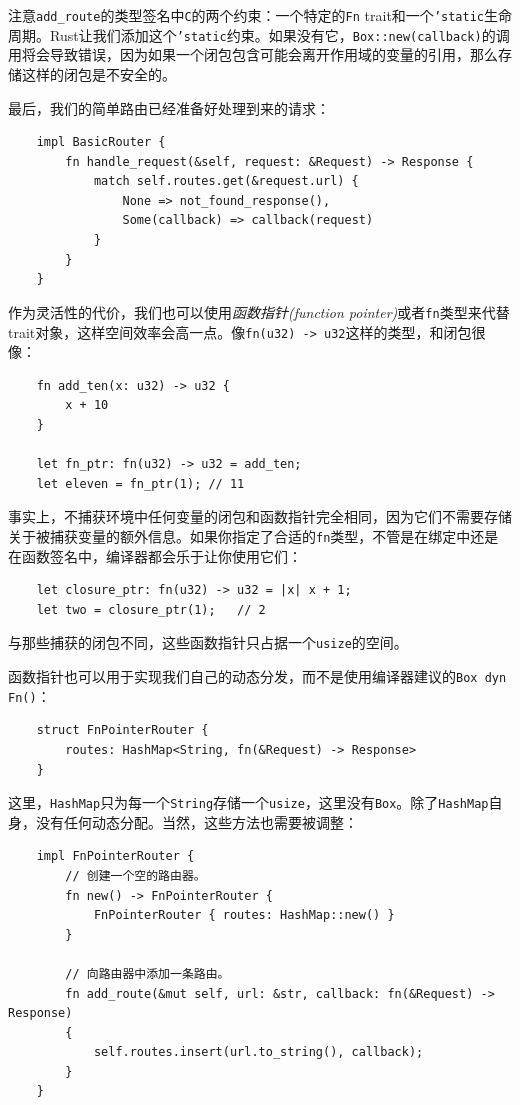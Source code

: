 \begin{note}
    注意\texttt{add\_route}的类型签名中\texttt{C}的两个约束：一个特定的\texttt{Fn} trait和一个\texttt{'static}生命周期。Rust让我们添加这个\texttt{'static}约束。如果没有它，\texttt{Box::new(callback)}的调用将会导致错误，因为如果一个闭包包含可能会离开作用域的变量的引用，那么存储这样的闭包是不安全的。
\end{note}

最后，我们的简单路由已经准备好处理到来的请求：
\begin{verbatim}
    impl BasicRouter {
        fn handle_request(&self, request: &Request) -> Response {
            match self.routes.get(&request.url) {
                None => not_found_response(),
                Some(callback) => callback(request)
            }
        }
    }
\end{verbatim}

作为灵活性的代价，我们也可以使用\emph{函数指针(function pointer)}或者\texttt{fn}类型来代替trait对象，这样空间效率会高一点。像\texttt{fn(u32) -> u32}这样的类型，和闭包很像：
\begin{verbatim}
    fn add_ten(x: u32) -> u32 {
        x + 10
    }

    let fn_ptr: fn(u32) -> u32 = add_ten;
    let eleven = fn_ptr(1); // 11
\end{verbatim}

事实上，不捕获环境中任何变量的闭包和函数指针完全相同，因为它们不需要存储关于被捕获变量的额外信息。如果你指定了合适的\texttt{fn}类型，不管是在绑定中还是在函数签名中，编译器都会乐于让你使用它们：
\begin{verbatim}
    let closure_ptr: fn(u32) -> u32 = |x| x + 1;
    let two = closure_ptr(1);   // 2
\end{verbatim}

与那些捕获的闭包不同，这些函数指针只占据一个\texttt{usize}的空间。

函数指针也可以用于实现我们自己的动态分发，而不是使用编译器建议的\texttt{Box dyn Fn()}：
\begin{verbatim}
    struct FnPointerRouter {
        routes: HashMap<String, fn(&Request) -> Response>
    }
\end{verbatim}

这里，\texttt{HashMap}只为每一个\texttt{String}存储一个\texttt{usize}，这里没有\texttt{Box}。除了\texttt{HashMap}自身，没有任何动态分配。当然，这些方法也需要被调整：
\begin{verbatim}
    impl FnPointerRouter {
        // 创建一个空的路由器。
        fn new() -> FnPointerRouter {
            FnPointerRouter { routes: HashMap::new() }
        }

        // 向路由器中添加一条路由。
        fn add_route(&mut self, url: &str, callback: fn(&Request) -> Response)
        {
            self.routes.insert(url.to_string(), callback);
        }
    }
\end{verbatim}

